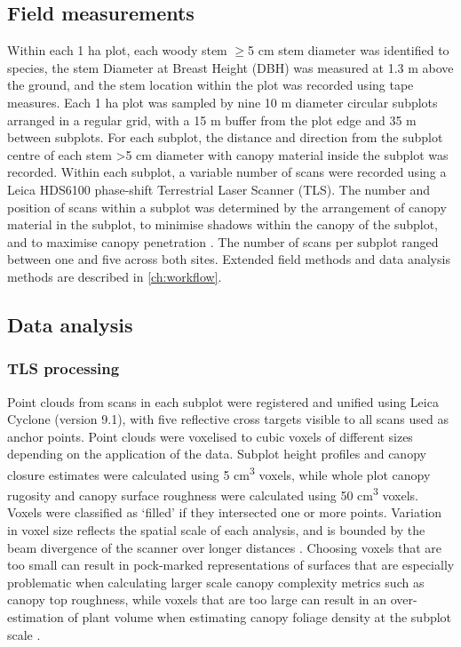 \begin{refsection}
\subsection{Field measurements}
\label{tls:ssec:field}

Within each 1 ha plot, each woody stem $\geq$5 cm stem diameter was identified to species, the stem Diameter at Breast Height (DBH) was measured at 1.3 m above the ground, and the stem location within the plot was recorded using tape measures. Each 1 ha plot was sampled by nine 10 m diameter circular subplots arranged in a regular grid, with a 15 m buffer from the plot edge and 35 m between subplots. For each subplot, the distance and direction from the subplot centre of each stem >5 cm diameter with canopy material inside the subplot was recorded. Within each subplot, a variable number of scans were recorded using a Leica HDS6100 phase-shift Terrestrial Laser Scanner (TLS). The number and position of scans within a subplot was determined by the arrangement of canopy material in the subplot, to minimise shadows within the canopy of the subplot, and to maximise canopy penetration \citep{Beland2021b}. The number of scans per subplot ranged between one and five across both sites. Extended field methods and data analysis methods are described in \autoref{ch:workflow}.

\subsection{Data analysis}
\label{tls:ssec:analysis}

\subsubsection{TLS processing}
\label{tls:sssec:tls_process}

Point clouds from scans in each subplot were registered and unified using Leica Cyclone (version 9.1), with five reflective cross targets visible to all scans used as anchor points. Point clouds were voxelised to cubic voxels of different sizes depending on the application of the data. Subplot height profiles and canopy closure estimates  were calculated using 5 cm\textsuperscript{3} voxels, while whole plot canopy rugosity and canopy surface roughness were calculated using 50 cm\textsuperscript{3} voxels. Voxels were classified as `filled' if they intersected one or more points. Variation in voxel size reflects the spatial scale of each analysis, and is bounded by the beam divergence of the scanner over longer distances \citep{Cifuentes2014}. Choosing voxels that are too small can result in pock-marked representations of surfaces that are especially problematic when calculating larger scale canopy complexity metrics such as canopy top roughness, while voxels that are too large can result in an over-estimation of plant volume when estimating canopy foliage density at the subplot scale \citep{Seidel2012, Cifuentes2014}. 


\end{refsection}
